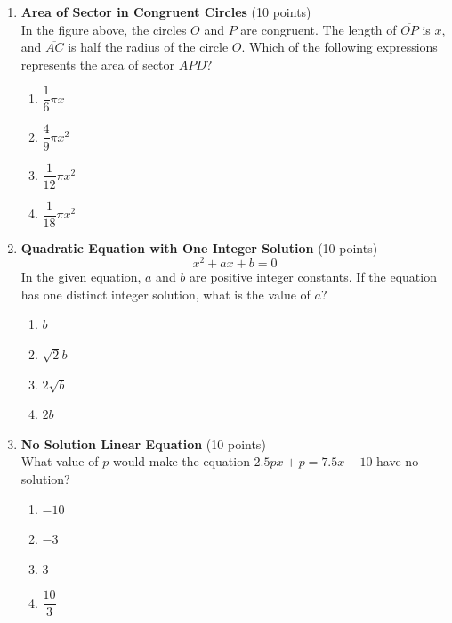 \begin{enumerate}
  \newpage

  \item \textbf{Area of Sector in Congruent Circles} (10 points)\\
  In the figure above, the circles $O$ and $P$ are congruent. The length of 
  $\overline{O P}$ is $x$, and $\overline{A C}$ is half the radius of the 
  circle $O$. Which of the following expressions represents the area of 
  sector $A P D$?
  \begin{enumerate}[label=(\Alph*)]
    \item $\dfrac{1}{6} \pi x$
    \item $\dfrac{4}{9} \pi x^2$
    \item $\dfrac{1}{12} \pi x^2$
    \item $\dfrac{1}{18} \pi x^2$
  \end{enumerate}
  \begin{subanswer}
  \end{subanswer}

  \item \textbf{Quadratic Equation with One Integer Solution} (10 points)\\
  $$
  x^2+a x+b=0
  $$
  In the given equation, $a$ and $b$ are positive integer constants. If 
  the equation has one distinct integer solution, what is the value of $a$?
  \begin{enumerate}[label=(\Alph*)]
    \item $b$
    \item $\sqrt{2} b$
    \item $2 \sqrt{b}$
    \item $2 b$
  \end{enumerate}
  \begin{subanswer}
  \end{subanswer}











  \newpage


  \item \textbf{No Solution Linear Equation} (10 points)\\
  What value of $p$ would make the equation $2.5 p x + p = 7.5 x - 10$ have no solution?
  \begin{enumerate}[label=(\Alph*)]
    \item $-10$
    \item $-3$
    \item $3$
    \item $\dfrac{10}{3}$
  \end{enumerate}
  \begin{subanswer}
  \end{subanswer}


\end{enumerate}
